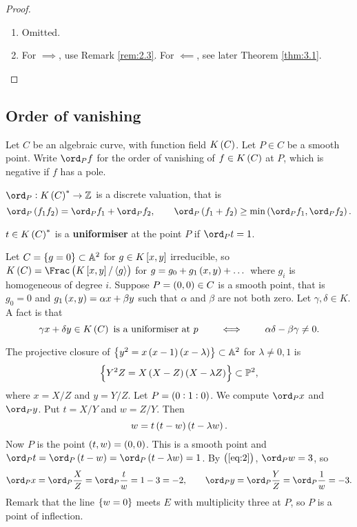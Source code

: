 \begin{proof}
\hfill
\begin{enumerate}
\item Omitted.
\item For $ \implies $, use Remark \ref{rem:2.3}. For $ \impliedby $, see later Theorem \ref{thm:3.1}.
\end{enumerate}
\end{proof}

\subsection{Order of vanishing}

Let $ C $ be an algebraic curve, with function field $ K\br{C} $. Let $ P \in C $ be a smooth point. Write $ \ord_P f $ for the order of vanishing of $ f \in K\br{C} $ at $ P $, which is negative if $ f $ has a pole.

\begin{fact*}
$ \ord_P : K\br{C}^* \to \ZZ $ is a discrete valuation, that is
$$ \ord_P \br{f_1f_2} = \ord_P f_1 + \ord_P f_2, \qquad \ord_P \br{f_1 + f_2} \ge \min\br{\ord_P f_1, \ord_P f_2}. $$
\end{fact*}

\begin{definition*}
$ t \in K\br{C}^* $ is a \textbf{uniformiser} at the point $ P $ if $ \ord_P t = 1 $.
\end{definition*}

\pagebreak

\begin{example}
Let $ C = \cbr{g = 0} \subset \AA^2 $ for $ g \in K\sbr{x, y} $ irreducible, so $ K\br{C} = \Frac \br{K\sbr{x, y} / \abr{g}} $ for $ g = g_0 + g_1\br{x, y} + \dots $ where $ g_i $ is homogeneous of degree $ i $. Suppose $ P = \br{0, 0} \in C $ is a smooth point, that is $ g_0 = 0 $ and $ g_1\br{x, y} = \alpha x + \beta y $ such that $ \alpha $ and $ \beta $ are not both zero. Let $ \gamma, \delta \in K $. A fact is that
$$ \gamma x + \delta y \in K\br{C} \ \text{is a uniformiser at} \ p \qquad \iff \qquad \alpha\delta - \beta\gamma \ne 0. $$
\end{example}

\begin{example}
\label{eg:2.6}
The projective closure of $ \cbr{y^2 = x\br{x - 1}\br{x - \lambda}} \subset \AA^2 $ for $ \lambda \ne 0, 1 $ is
$$ \cbr{Y^2Z = X\br{X - Z}\br{X - \lambda Z}} \subset \PP^2, $$
where $ x = X / Z $ and $ y = Y / Z $. Let $ P = \br{0 : 1 : 0} $. We compute $ \ord_P x $ and $ \ord_P y $. Put $ t = X / Y $ and $ w = Z / Y $. Then
\begin{equation}
\label{eq:2}
w = t\br{t - w}\br{t - \lambda w}.
\end{equation}
Now $ P $ is the point $ \br{t, w} = \br{0, 0} $. This is a smooth point and $ \ord_P t = \ord_P \br{t - w} = \ord_P \br{t - \lambda w} = 1 $. By $ \br{\ref{eq:2}} $, $ \ord_P w = 3 $, so
$$ \ord_P x = \ord_P \dfrac{X}{Z} = \ord_P \dfrac{t}{w} = 1 - 3 = -2, \qquad \ord_P y = \ord_P \dfrac{Y}{Z} = \ord_P \dfrac{1}{w} = -3. $$
Remark that the line $ \cbr{w = 0} $ meets $ E $ with multiplicity three at $ P $, so $ P $ is a point of inflection.
\end{example}

